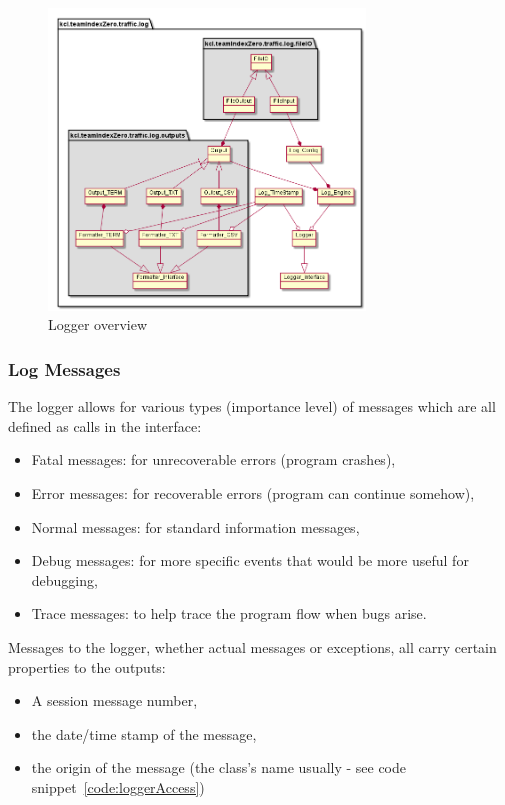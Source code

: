 \begin{figure}[!h]
	\vspace{1.5em}
  	\caption{Logger overview}
  	\label{fig:logger_overview}
  	\centering
	\includegraphics[width=0.75\textwidth]{figs/logger/LogModuleObjectDiagram.png}
  	\vspace{1.5em}
\end{figure}

\subsubsection{Log Messages}
The logger allows for various types (importance level) of messages which are all defined as calls in the interface:
\begin{itemize}
	\item Fatal messages: for unrecoverable errors (program crashes),
	\item Error messages: for recoverable errors (program can continue somehow),
	\item Normal messages: for standard information messages,
	\item Debug messages: for more specific events that would be more useful for debugging,
	\item Trace messages: to help trace the program flow when bugs arise.
\end{itemize}

Messages to the logger, whether actual messages or exceptions, all carry certain properties to the outputs:
\begin{itemize}
	\item A session message number,
	\item the date/time stamp of the message,
	\item the origin of the message (the class's name usually - see code snippet~\ref{code:loggerAccess})
\end{itemize}

